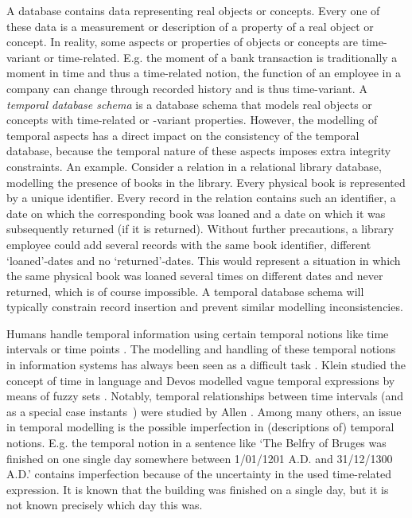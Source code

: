 A database contains data representing real objects or concepts. Every one of these data is a measurement or description of a property of a real object or concept. In reality, some aspects or properties of objects or concepts are time-variant or time-related. E.g. the moment of a bank transaction is traditionally a moment in time and thus a time-related notion, the function of an employee in a company can change through recorded history and is thus time-variant. A \emph{temporal database schema} \cite{Dyreson1994} is a database schema that models real objects or concepts with time-related or -variant properties. However, the modelling of temporal aspects has a direct impact on the consistency of the temporal database, because the temporal nature of these aspects imposes extra integrity constraints. An example. Consider a relation in a relational library database, modelling the presence of books in the library. Every physical book is represented by a unique identifier. Every record in the relation contains such an identifier, a date on which the corresponding book was loaned and a date on which it was subsequently returned (if it is returned). Without further precautions, a library employee could add several records with the same book identifier, different `loaned'-dates and no `returned'-dates. This would represent a situation in which the same physical book was loaned several times on different dates and never returned, which is of course impossible. A temporal database schema will typically constrain record insertion and prevent similar modelling inconsistencies.

Humans handle temporal information using certain temporal notions like time intervals or time points \cite{Dyreson1994}. The modelling and handling of these temporal notions in information systems has always been seen as a difficult task \cite{Bolour82}. Klein \cite{klein94} studied the concept of time in language and Devos \cite{devos94} modelled vague temporal expressions by means of fuzzy sets \cite{zadeh65}. Notably, temporal relationships between time intervals (and as a special case instants~\cite{Dyreson1994}) were studied by Allen \cite{Allen83}. Among many others, an issue in temporal modelling is the possible imperfection in (descriptions of) temporal notions. E.g. the temporal notion in a sentence like `The Belfry of Bruges was finished on one single day somewhere between 1/01/1201 A.D. and 31/12/1300 A.D.' contains imperfection because of the uncertainty in the used time-related expression. It is known that the building was finished on a single day, but it is not known precisely which day this was.


